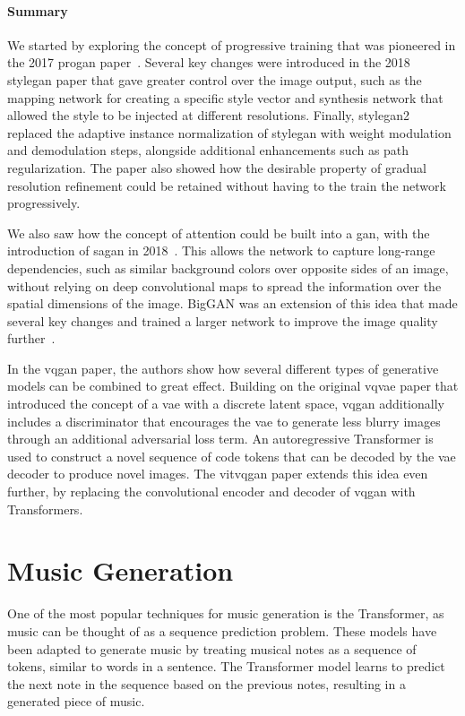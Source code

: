 \paragraph{Summary}

We started by exploring the concept of progressive training that was pioneered in the 2017 \gls{progan} paper~\cite{Karras2018Feb}.
Several key changes were introduced in the 2018 \gls{stylegan} paper that gave greater control over the image output, such as the mapping network for creating a specific style vector and synthesis network that allowed the style to be injected at different resolutions.
Finally, \gls{stylegan}2 replaced the adaptive instance normalization of \gls{stylegan} with weight modulation and demodulation steps, alongside additional enhancements such as path regularization.
The paper also showed how the desirable property of gradual resolution refinement could be retained without having to the train the network progressively.

We also saw how the concept of attention could be built into a \gls{gan}, with the introduction of \gls{sagan} in 2018~\cite{zhang2019selfattention}.
This allows the network to capture long-range dependencies, such as similar background colors over opposite sides of an image, without relying on deep convolutional maps to spread the information over the spatial dimensions of the image.
BigGAN was an extension of this idea that made several key changes and trained a larger network to improve the image quality further~\cite{brock2019large}.

In the \gls{vqgan} paper, the authors show how several different types of generative models can be combined to great effect.
Building on the original \gls{vqvae} paper that introduced the concept of a \gls{vae} with a discrete latent space, \gls{vqgan} additionally includes a discriminator that encourages the \gls{vae} to generate less blurry images through an additional adversarial loss term.
An autoregressive Transformer is used to construct a novel sequence of code tokens that can be decoded by the \gls{vae} decoder to produce novel images.
The \gls{vitvqgan} paper extends this idea even further, by replacing the convolutional encoder and decoder of \gls{vqgan} with Transformers.


\section{Music Generation}

One of the most popular techniques for music generation is the Transformer, as music can be thought of as a sequence prediction problem.
These models have been adapted to generate music by treating musical notes as a sequence of tokens, similar to words in a sentence.
The Transformer model learns to predict the next note in the sequence based on the previous notes, resulting in a generated piece of music.

